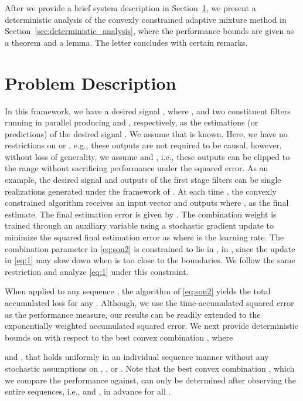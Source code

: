 \documentclass[journal]{IEEEtran}
\begin{document}
After we provide a brief system description in
Section~\ref{sec:problem_description}, we present a deterministic
analysis of the convexly constrained adaptive mixture method in
Section~\ref{sec:deterministic_analysis}, where the performance bounds
are given as a theorem and a lemma. The letter concludes with certain
remarks.

\section{Problem Description}

\label{sec:problem_description}
In this framework, we have a desired signal , where , and two constituent filters running in parallel producing
 and ,
respectively, as the estimations (or predictions) of the desired
signal . We assume that  is known. Here, we have no
restrictions on  or , e.g., these outputs
are not required to be causal, however, without loss of generality, we
assume  and , i.e.,
these outputs can be clipped to the range  without sacrificing
performance under the squared error. As an example, the desired signal
and outputs of the first stage filters can be single realizations
generated under the framework of \cite{convex}. At each time , the
convexly constrained algorithm receives an input vector  and outputs
\normalsize
where , as the final estimate. The final estimation error is given by . The combination weight  is trained through an
auxiliary variable using a stochastic gradient update to minimize the
squared final estimation error as
\normalsize
where  is the learning rate. The combination
parameter  in \eqref{eq:son2} is constrained to lie in
,  in \cite{convex},
since the update in \eqref{eq:1} may slow down when  is
too close to the boundaries. We follow the same restriction and
analyze \eqref{eq:1} under this constraint.

When applied to any sequence , the algorithm of \eqref{eq:son2}
yields the total accumulated loss
\normalsize
for any . Although, we use the time-accumulated squared error as
the performance measure, our results can be readily extended to
the exponentially weighted accumulated squared error. We next provide deterministic bounds on  with respect to the best convex combination , where

and ,
that holds uniformly in an individual sequence manner without any
stochastic assumptions on , ,  or
. Note that the best convex combination , which we compare
the performance against,
can only be determined after observing the entire sequences, i.e.,
 and , in advance for all .
\end{document}
